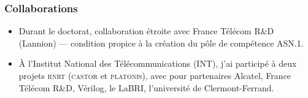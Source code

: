 \documentclass[compress,dvips,xcolor={dvipsnames},t]{beamer}
\begin{document}










\begin{frame}
\frametitle{Collaborations}

\begin{itemize}

  \item Durant le doctorat, collaboration étroite avec France Télécom
        R\&D (Lannion) --- condition propice à la création du pôle de
        compétence \mbox{ASN.1}.

  \item À l'Institut National des Télécommunications (INT), j'ai
        participé à deux projets \textsc{rnrt} (\textsc{castor} et
        \textsc{platonis}), avec pour partenaires Alcatel, France
        Télécom R\&D, Vérilog, le LaBRI, l'université de
        Clermont-Ferrand.



\end{itemize}

\end{frame}
\end{document}
